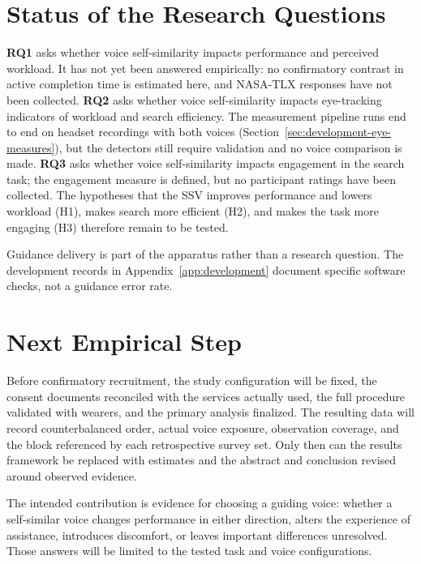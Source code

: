 \section{Status of the Research Questions}
\textbf{RQ1} asks whether voice self-similarity impacts performance and perceived workload. It has not yet been answered empirically: no confirmatory contrast in active completion time is estimated here, and NASA-TLX responses have not been collected. \textbf{RQ2} asks whether voice self-similarity impacts eye-tracking indicators of workload and search efficiency. The measurement pipeline runs end to end on headset recordings with both voices (Section~\ref{sec:development-eye-measures}), but the detectors still require validation and no voice comparison is made. \textbf{RQ3} asks whether voice self-similarity impacts engagement in the search task; the engagement measure is defined, but no participant ratings have been collected. The hypotheses that the SSV improves performance and lowers workload (H1), makes search more efficient (H2), and makes the task more engaging (H3) therefore remain to be tested.

Guidance delivery is part of the apparatus rather than a research question. The development records in Appendix~\ref{app:development} document specific software checks, not a guidance error rate.

\section{Next Empirical Step}
Before confirmatory recruitment, the study configuration will be fixed, the consent documents reconciled with the services actually used, the full procedure validated with wearers, and the primary analysis finalized. The resulting data will record counterbalanced order, actual voice exposure, observation coverage, and the block referenced by each retrospective survey set. Only then can the results framework be replaced with estimates and the abstract and conclusion revised around observed evidence.

The intended contribution is evidence for choosing a guiding voice: whether a self-similar voice changes performance in either direction, alters the experience of assistance, introduces discomfort, or leaves important differences unresolved. Those answers will be limited to the tested task and voice configurations.
